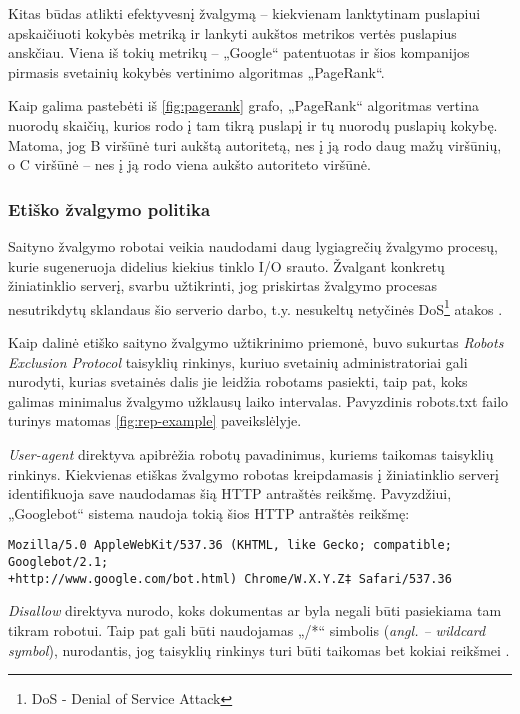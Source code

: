 Kitas būdas atlikti efektyvesnį žvalgymą -- kiekvienam lanktytinam puslapiui apskaičiuoti kokybės metriką ir lankyti aukštos metrikos vertės puslapius anskčiau. Viena iš tokių metrikų -- „Google“ patentuotas ir šios kompanijos pirmasis svetainių kokybės vertinimo algoritmas „PageRank“.



Kaip galima pastebėti iš \ref{fig:pagerank} grafo, „PageRank“ algoritmas vertina nuorodų skaičių, kurios rodo į tam tikrą puslapį ir tų nuorodų puslapių kokybę. Matoma, jog B viršūnė turi aukštą autoritetą, nes į ją rodo daug mažų viršūnių, o C viršūnė -- nes į ją rodo viena aukšto autoriteto viršūnė.

\subsubsection{Etiško žvalgymo politika}

Saityno žvalgymo robotai veikia naudodami daug lygiagrečių žvalgymo procesų, kurie sugeneruoja didelius kiekius tinklo I/O srauto. Žvalgant konkretų žiniatinklio serverį, svarbu užtikrinti, jog priskirtas žvalgymo procesas nesutrikdytų sklandaus šio serverio darbo, t.y. nesukeltų netyčinės DoS\footnote{DoS - Denial of Service Attack} atakos \cite{EffectiveWebCrawling}. 


Kaip dalinė etiško saityno žvalgymo užtikrinimo priemonė, buvo sukurtas \textit{Robots Exclusion Protocol} taisyklių rinkinys, kuriuo svetainių administratoriai gali nurodyti, kurias svetainės dalis jie leidžia robotams pasiekti, taip pat, koks galimas minimalus žvalgymo užklausų laiko intervalas. Pavyzdinis robots.txt failo turinys matomas \ref{fig:rep-example} paveikslėlyje.



\textit{User-agent} direktyva apibrėžia robotų pavadinimus, kuriems taikomas taisyklių rinkinys. Kiekvienas etiškas žvalgymo robotas kreipdamasis į žiniatinklio serverį identifikuoja save naudodamas šią HTTP antraštės reikšmę. Pavyzdžiui, „Googlebot“ sistema naudoja tokią šios HTTP antraštės reikšmę:
\begin{verbatim}
Mozilla/5.0 AppleWebKit/537.36 (KHTML, like Gecko; compatible; Googlebot/2.1; 
+http://www.google.com/bot.html) Chrome/W.X.Y.Z‡ Safari/537.36
\end{verbatim}
\textit{Disallow} direktyva nurodo, koks dokumentas ar byla negali būti pasiekiama tam tikram robotui. Taip pat gali būti naudojamas „/*“ simbolis (\textit{angl. -- wildcard symbol}), nurodantis, jog taisyklių rinkinys turi būti taikomas bet kokiai reikšmei \cite{RobotsExclusionProtocol}.

